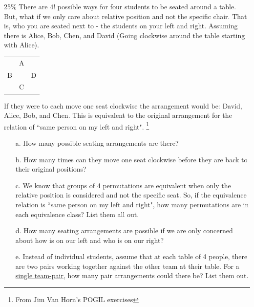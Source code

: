 \documentclass[a4paper,12pt]{book}
\begin{document}
        \newpage
        \begin{question}{6}{25\%}
            There are $4!$ possible ways for four students to be seated around a table.
            But, what if we only care about relative position and not the specific chair.
            That is, who you are seated next to - the students on your left and right.
            Assuming there is Alice, Bob, Chen, and David (Going clockwise around the table starting with Alice).

            \begin{center}
                \begin{tabular}{c c c}
                    & A & \\
                    B & & D \\
                    & C &
                \end{tabular}
            \end{center}

            If they were to each move one seat clockwise the arrangement would be: David, Alice, Bob, and Chen.
            This is equivalent to the original arrangement for the relation of ``same person on my left and right".
            \footnote{From Jim Van Horn's POGIL exercises}

            \begin{enumerate}
                \item[a.] How many possible seating arrangements are there?
                \item[b.] How many times can they move one seat clockwise before they are back to their original positions?
                \item[c.] We know that groups of 4 permutations are equivalent when only the relative position is
                    considered and not the specific seat. So, if the equivalence relation is ``same person on my left and right",
                    how many permutations are in each equivalence class? List them all out.
                \item[d.] How many seating arrangements are possible if we are only concerned about how is on our left and who is on our right?
                \item[e.] Instead of individual students, assume that at each table of 4 people, there are two pairs working together against
                    the other team at their table.
                    For a \underline{single team-pair,} how many pair arrangements could there be? List them out.
            \end{enumerate}
        \end{question}
    
\end{document}
